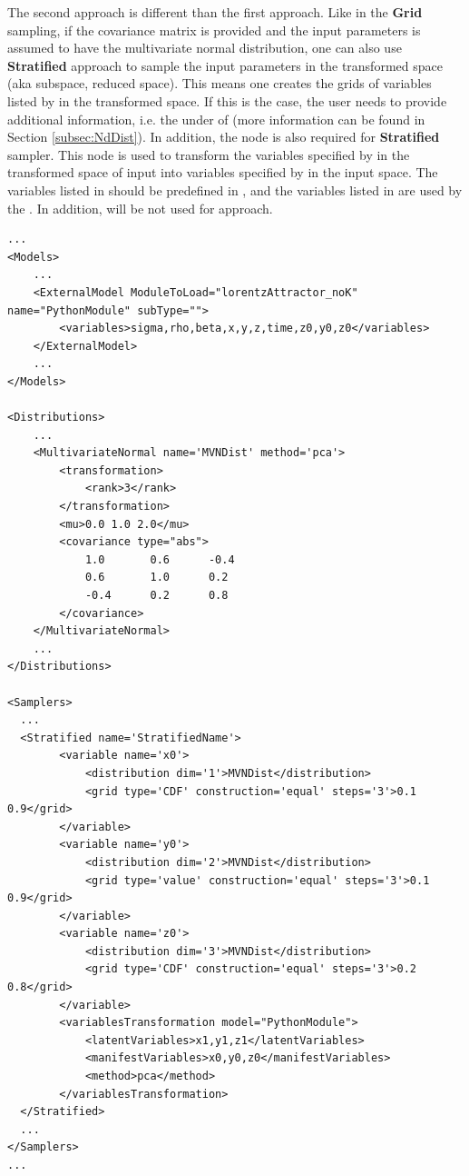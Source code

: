 The second approach is different than the first approach. Like in the \textbf{Grid} sampling, if the covariance matrix is provided
and the input parameters is assumed to have the multivariate normal distribution, one can also use \textbf{Stratified} approach to
sample the input parameters in the transformed space (aka subspace, reduced space). This means one creates
the grids of variables listed by  in the transformed space. If this is the case, the user needs to
provide additional information, i.e. the  under  of 
(more information can be found in Section \ref{subsec:NdDist}). In addition, the node  is also
required for \textbf{Stratified} sampler. This node is used to transform the variables specified by  in the
transformed space of input into variables specified by  in the input space. The variables listed
in  should be predefined in , and the variables listed in 
are used by the . In addition,  will be not used for approach.



\begin{lstlisting}[style=XML,morekeywords={ND,grid}]
...
<Models>
    ...
    <ExternalModel ModuleToLoad="lorentzAttractor_noK" name="PythonModule" subType="">
        <variables>sigma,rho,beta,x,y,z,time,z0,y0,z0</variables>
    </ExternalModel>
    ...
</Models>

<Distributions>
    ...
    <MultivariateNormal name='MVNDist' method='pca'>
        <transformation>
            <rank>3</rank>
        </transformation>
        <mu>0.0 1.0 2.0</mu>
        <covariance type="abs">
            1.0       0.6      -0.4
            0.6       1.0      0.2
            -0.4      0.2      0.8
        </covariance>
    </MultivariateNormal>
    ...
</Distributions>

<Samplers>
  ...
  <Stratified name='StratifiedName'>
        <variable name='x0'>
            <distribution dim='1'>MVNDist</distribution>
            <grid type='CDF' construction='equal' steps='3'>0.1 0.9</grid>
        </variable>
        <variable name='y0'>
            <distribution dim='2'>MVNDist</distribution>
            <grid type='value' construction='equal' steps='3'>0.1 0.9</grid>
        </variable>
        <variable name='z0'>
            <distribution dim='3'>MVNDist</distribution>
            <grid type='CDF' construction='equal' steps='3'>0.2 0.8</grid>
        </variable>
        <variablesTransformation model="PythonModule">
            <latentVariables>x1,y1,z1</latentVariables>
            <manifestVariables>x0,y0,z0</manifestVariables>
            <method>pca</method>
        </variablesTransformation>
  </Stratified>
  ...
</Samplers>
...
\end{lstlisting}

